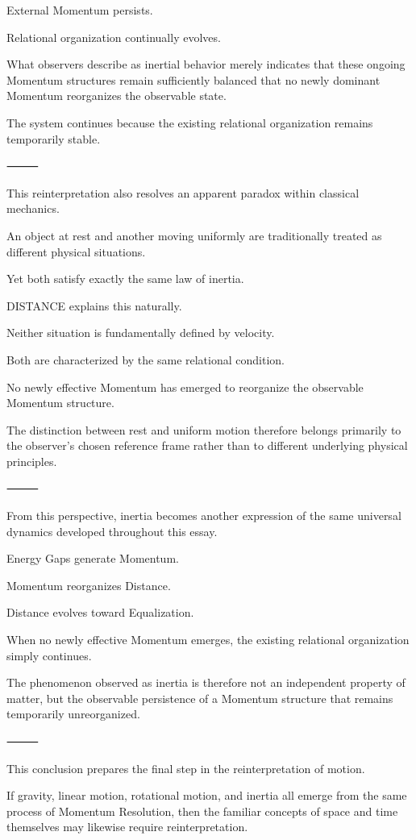 External Momentum persists.

Relational organization continually evolves.

What observers describe as inertial behavior merely indicates that these ongoing Momentum structures remain sufficiently balanced that no newly dominant Momentum reorganizes the observable state.

The system continues because the existing relational organization remains temporarily stable.

⸻

This reinterpretation also resolves an apparent paradox within classical mechanics.

An object at rest and another moving uniformly are traditionally treated as different physical situations.

Yet both satisfy exactly the same law of inertia.

DISTANCE explains this naturally.

Neither situation is fundamentally defined by velocity.

Both are characterized by the same relational condition.

No newly effective Momentum has emerged to reorganize the observable Momentum structure.

The distinction between rest and uniform motion therefore belongs primarily to the observer’s chosen reference frame rather than to different underlying physical principles.

⸻

From this perspective, inertia becomes another expression of the same universal dynamics developed throughout this essay.

Energy Gaps generate Momentum.

Momentum reorganizes Distance.

Distance evolves toward Equalization.

When no newly effective Momentum emerges, the existing relational organization simply continues.

The phenomenon observed as inertia is therefore not an independent property of matter, but the observable persistence of a Momentum structure that remains temporarily unreorganized.

⸻

This conclusion prepares the final step in the reinterpretation of motion.

If gravity, linear motion, rotational motion, and inertia all emerge from the same process of Momentum Resolution, then the familiar concepts of space and time themselves may likewise require reinterpretation.

